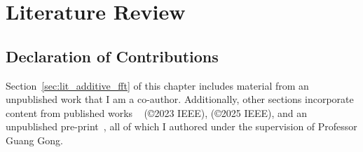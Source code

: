 \chapter{Literature Review}\label{ch:lit_review}

\section*{Declaration of Contributions}
Section~\ref{sec:lit_additive_fft} of this chapter includes material from an unpublished work that I am a co-author. Additionally, other sections incorporate content from published works ~\cite{Badakhshan2023Outline} (\copyright \hspace{.1em}2023 IEEE), \cite{Badakhshan2025AuroraZupply} (\copyright \hspace{.1em}2025 IEEE), and an unpublished pre-print~\cite{Badakhshan2024Zupply}, all of which I authored under the supervision of Professor Guang Gong.

